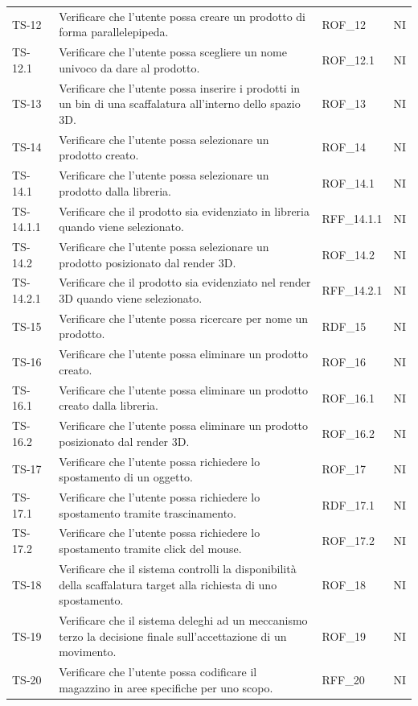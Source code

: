 \begin{xltabular}{0.9\textwidth}{X | p{0.5\textwidth} | X | X}
    TS-12 & Verificare che l'utente possa creare un prodotto di forma parallelepipeda. & ROF\_12& NI \\
    TS-12.1& Verificare che l'utente possa scegliere un nome univoco da dare al prodotto. & ROF\_12.1& NI \\
    TS-13 & Verificare che l'utente possa inserire i prodotti in un bin di una scaffalatura all'interno dello spazio 3D. & ROF\_13& NI\\
    TS-14 & Verificare che l'utente possa selezionare un prodotto creato. & ROF\_14 & NI\\
    TS-14.1 & Verificare che l'utente possa selezionare un prodotto dalla libreria. & ROF\_14.1& NI\\
    TS-14.1.1 & Verificare che il prodotto sia evidenziato in libreria quando viene selezionato. & RFF\_14.1.1& NI \\
    TS-14.2 & Verificare che l'utente possa selezionare un prodotto posizionato dal render 3D. & ROF\_14.2& NI\\
    TS-14.2.1 & Verificare che il prodotto sia evidenziato nel render 3D quando viene selezionato. & RFF\_14.2.1& NI\\
    TS-15 & Verificare che l'utente possa ricercare per nome un prodotto. & RDF\_15& NI\\
    TS-16& Verificare che l'utente possa eliminare un prodotto creato. & ROF\_16& NI\\
    TS-16.1 & Verificare che l'utente possa eliminare un prodotto creato dalla libreria. & ROF\_16.1& NI \\
    TS-16.2 & Verificare che l'utente possa eliminare un prodotto posizionato dal render 3D. & ROF\_16.2& NI \\
    TS-17& Verificare che l'utente possa richiedere lo spostamento di un oggetto. & ROF\_17& NI\\
    TS-17.1 & Verificare che l'utente possa richiedere lo spostamento tramite trascinamento. & RDF\_17.1& NI\\
    TS-17.2 & Verificare che l'utente possa richiedere lo spostamento tramite click del mouse. & ROF\_17.2& NI\\
    TS-18 & Verificare che il sistema controlli la disponibilità della scaffalatura target alla richiesta di uno spostamento. & ROF\_18& NI\\
    TS-19  & Verificare che il sistema deleghi ad un meccanismo terzo la decisione finale sull'accettazione di un movimento. & ROF\_19& NI\\
    TS-20  & Verificare che l'utente possa codificare il magazzino in aree specifiche per uno scopo. & RFF\_20 & NI \\
    \hline
\end{xltabular}

